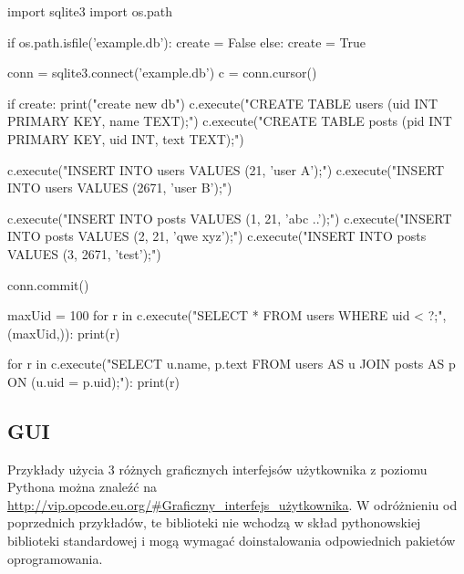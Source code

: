 \begin{CodeFrame*}[python]{}

import sqlite3
import os.path

if os.path.isfile('example.db'):
	create = False
else:
	create = True

conn = sqlite3.connect('example.db')
c = conn.cursor()

if create:
	print("create new db")
	c.execute("CREATE TABLE users (uid INT PRIMARY KEY, name TEXT);")
	c.execute("CREATE TABLE posts (pid INT PRIMARY KEY, uid INT, text TEXT);")
	
	c.execute("INSERT INTO users VALUES (21, 'user A');")
	c.execute("INSERT INTO users VALUES (2671, 'user B');")
	
	c.execute("INSERT INTO posts VALUES (1, 21, 'abc ..');")
	c.execute("INSERT INTO posts VALUES (2, 21, 'qwe xyz');")
	c.execute("INSERT INTO posts VALUES (3, 2671, 'test');")

	conn.commit()

maxUid = 100
for r in c.execute("SELECT * FROM users WHERE uid < ?;", (maxUid,)):
	print(r)

for r in c.execute("SELECT u.name, p.text FROM users AS u JOIN posts AS p ON (u.uid = p.uid);"):
	print(r)
\end{CodeFrame*}

\subsection{GUI}

Przykłady użycia 3 różnych graficznych interfejsów użytkownika z poziomu Pythona można znaleźć na \url{http://vip.opcode.eu.org/#Graficzny_interfejs_użytkownika}.
W odróżnieniu od poprzednich przykładów, te biblioteki nie wchodzą w skład pythonowskiej biblioteki standardowej i mogą wymagać doinstalowania odpowiednich pakietów oprogramowania.
